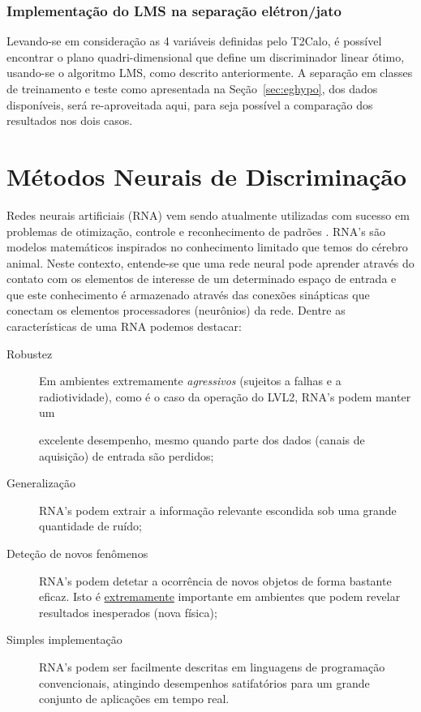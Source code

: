 \subsubsection{Implementação do LMS na separação elétron/jato}

Levando-se em consideração as 4 variáveis definidas pelo T2Calo, é possível
encontrar o plano quadri-dimensional que define um discriminador linear ótimo,
usando-se o algoritmo LMS, como descrito anteriormente. A separação em classes
de treinamento e teste como apresentada na Seção~\ref{sec:eghypo}, dos dados
disponíveis, será re-aproveitada aqui, para seja possível a comparação dos
resultados nos dois casos.



\section{Métodos Neurais de Discriminação}
\label{sec:neural}

Redes neurais artificiais (RNA) vem sendo atualmente utilizadas com sucesso em
problemas de otimização, controle e reconhecimento de padrões
\cite{haykin}. RNA's são modelos matemáticos inspirados no
conhecimento limitado que temos do cérebro animal. Neste contexto, entende-se
que uma rede neural pode aprender através do contato com os elementos de
interesse de um determinado espaço de entrada e que este conhecimento é
armazenado através das conexões sinápticas que conectam os elementos
processadores (neurônios) da rede. Dentre as características de uma RNA
podemos destacar:

\begin{description}
\item[Robustez] Em ambientes extremamente \emph{agressivos} (sujeitos a falhas
e a radiotividade), como é o caso da operação do LVL2, RNA's podem manter um

excelente desempenho, mesmo quando parte dos dados (canais de aquisição) de
entrada são perdidos;

\item[Generalização] RNA's podem extrair a informação relevante escondida sob
uma grande quantidade de ruído;

\item[Deteção de novos fenômenos] RNA's podem detetar a ocorrência de novos
objetos de forma bastante eficaz. Isto é \underline{extremamente} importante
em ambientes que podem revelar resultados inesperados (nova física);

\item[Simples implementação] RNA's podem ser facilmente descritas em
linguagens de programação convencionais, atingindo desempenhos satifatórios
para um grande conjunto de aplicações em tempo real.
\end{description}

